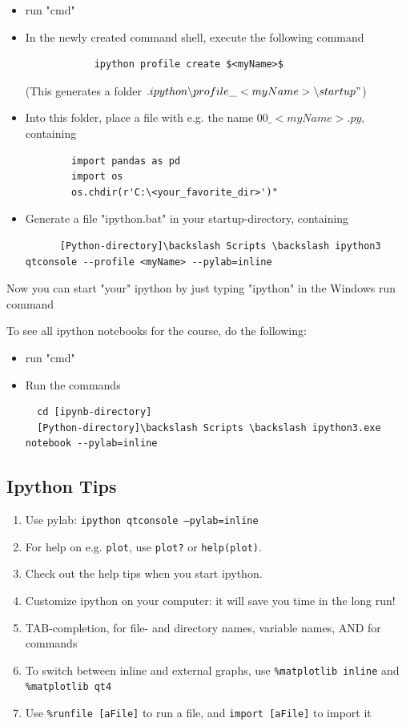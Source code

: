 \begin{itemize}
  \item run "cmd"

  \item In the newly created command shell, execute the following command
        \begin{lstlisting}
            ipython profile create $<myName>$
        \end{lstlisting}
        (This generates a folder $.ipython \backslash profile\_<myName> \backslash startup"$)
  \item Into this folder, place a file with e.g. the name $00\_<myName>.py$, containing
        \begin{lstlisting}
        import pandas as pd
        import os
        os.chdir(r'C:\<your_favorite_dir>')"
        \end{lstlisting}
  \item Generate a file "ipython.bat" in your startup-directory, containing
      \begin{lstlisting}
      [Python-directory]\backslash Scripts \backslash ipython3 qtconsole --profile <myName> --pylab=inline
      \end{lstlisting}
\end{itemize}

Now you can start "your" ipython by just typing "ipython" in the Windows run command

To see all ipython notebooks for the course, do the following:
\begin{itemize}
  \item run "cmd"
  \item Run the commands
  \begin{lstlisting}
  cd [ipynb-directory]
  [Python-directory]\backslash Scripts \backslash ipython3.exe notebook --pylab=inline
  \end{lstlisting}
\end{itemize}



\subsection{Ipython Tips}

\begin{enumerate}
    \item Use pylab: \texttt{ipython qtconsole ---pylab=inline}
    \item For help on e.g. \texttt{plot}, use \texttt{plot?} or \texttt{help(plot)}.
    \item Check out the help tips when you start ipython.
    \item Customize ipython on your computer: it will save you time in the long run!
    \item TAB-completion, for file- and directory names, variable names, AND for commands
    \item To switch between inline and external graphs, use \texttt{\%matplotlib inline} and \texttt{\%matplotlib qt4}
    \item Use \texttt{\%runfile [aFile]} to run a file, and \texttt{import [aFile]} to import it
\end{enumerate}

